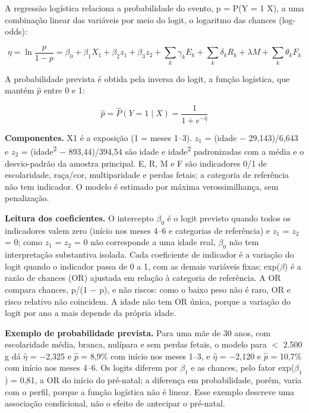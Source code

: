 \documentclass[10pt,a4paper]{article}
\newcommand{\menos}{\ensuremath{-}}
\newcommand{\menor}{\ensuremath{<}}
\newcommand{\subsecao}[2]{\par\needspace{5\baselineskip}\vspace{5pt}{\color{iptescuro}\bfseries{\color{iptazul}#1}~#2}\par\vspace{2pt}}
\begin{document}
\subsecao{3.3}{Equação do modelo}

A regressão logística relaciona a probabilidade do evento, p = P(Y = 1 \textbar{} X), a uma combinação linear das variáveis por meio do logit, o logaritmo das chances (log-odds):\par

\[\eta=\ln\frac{p}{1-p}=\beta_0+\beta_1X_1+\beta_2z_1+\beta_3z_2+\sum_k\gamma_kE_k+\sum_k\delta_kR_k+\lambda M+\sum_k\theta_kF_k\]

A probabilidade prevista é obtida pela inversa do logit, a função logística, que mantém \ensuremath{\hat p} entre 0 e 1:\par

\[\hat p=\hat P(Y=1\mid X)=\frac{1}{1+e^{-\hat\eta}}\]

{\color{iptescuro}\bfseries Componentes.} X1 é a exposição (1 = meses 1--3). \ensuremath{z_1} = (idade \menos{} 29,143)/6,643 e \ensuremath{z_2} = (idade\textsuperscript{2} \menos{} 893,44)/394,54 são idade e idade\textsuperscript{2} padronizadas com a média e o desvio-padrão da amostra principal. E, R, M e F são indicadores 0/1 de escolaridade, raça/cor, multiparidade e perdas fetais; a categoria de referência não tem indicador. O modelo é estimado por máxima verossimilhança, sem penalização.\par

{\color{iptescuro}\bfseries Leitura dos coeficientes.} O intercepto \ensuremath{\beta_0} é o logit previsto quando todos os indicadores valem zero (início nos meses 4--6 e categorias de referência) e \ensuremath{z_1} = \ensuremath{z_2} = 0; como \ensuremath{z_1} = \ensuremath{z_2} = 0 não corresponde a uma idade real, \ensuremath{\beta_0} não tem interpretação substantiva isolada. Cada coeficiente de indicador é a variação do logit quando o indicador passa de 0 a 1, com as demais variáveis fixas; exp(\ensuremath{\beta}) é a razão de chances (OR) ajustada em relação à categoria de referência. A OR compara chances, p/(1 \menos{} p), e não riscos: como o baixo peso não é raro, OR e risco relativo não coincidem. A idade não tem OR única, porque a variação do logit por ano a mais depende da própria idade.\par

{\color{iptescuro}\bfseries Exemplo de probabilidade prevista.} Para uma mãe de 30 anos, com escolaridade média, branca, nulípara e sem perdas fetais, o modelo para \menor{} 2.500 g dá \ensuremath{\hat\eta} = \menos{}2,325 e \ensuremath{\hat p} = 8,9\% com início nos meses 1--3, e \ensuremath{\hat\eta} = \menos{}2,120 e \ensuremath{\hat p} = 10,7\% com início nos meses 4--6. Os logits diferem por \ensuremath{\beta_1} e as chances, pelo fator exp(\ensuremath{\beta_1}) = 0,81, a OR do início do pré-natal; a diferença em probabilidade, porém, varia com o perfil, porque a função logística não é linear. Esse exemplo descreve uma associação condicional, não o efeito de antecipar o pré-natal.\par
\end{document}
